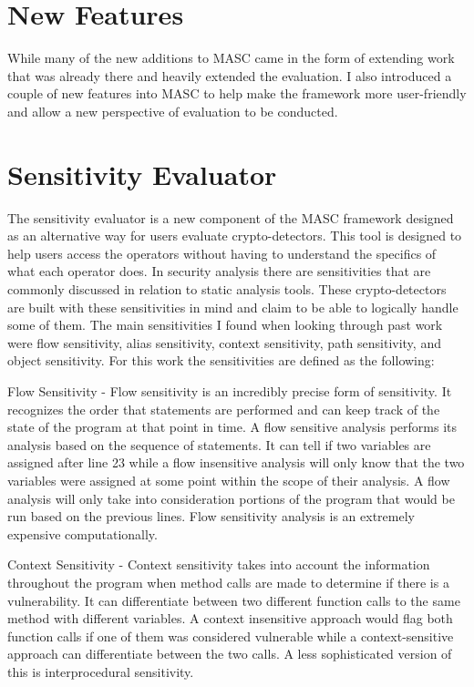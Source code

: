 \section{New Features}
\label{ch3:sec:new-features}

While many of the new additions to MASC came in the form of extending work that was already there and heavily extended the evaluation. I also introduced a couple of new features into MASC to help make the framework more user-friendly and allow a new perspective of evaluation to be conducted.

\section{Sensitivity Evaluator}
\label{ch3:subsec:sensitities}

The sensitivity evaluator is a new component of the MASC framework designed as an alternative way for users evaluate crypto-detectors. This tool is designed to help users access the operators without having to understand the specifics of what each operator does. In security analysis there are sensitivities that are commonly discussed in relation to static analysis tools. These crypto-detectors are built with these sensitivities in mind and claim to be able to logically handle some of them. The main sensitivities I found when looking through past work were flow sensitivity, alias sensitivity, context sensitivity, path sensitivity, and object sensitivity. For this work the sensitivities are defined as the following:

Flow Sensitivity - Flow sensitivity is an incredibly precise form of sensitivity. It recognizes the order that statements are performed and can keep track of the state of the program at that point in time. A flow sensitive analysis performs its analysis based on the sequence of statements. It can tell if two variables are assigned after line 23 while a flow insensitive analysis will only know that the two variables were assigned at some point within the scope of their analysis. A flow analysis will only take into consideration portions of the program that would be run based on the previous lines. Flow sensitivity analysis is an extremely expensive computationally.

Context Sensitivity - Context sensitivity takes into account the information throughout the program when method calls are made to determine if there is a vulnerability. It can differentiate between two different function calls to the same method with different variables. A context insensitive approach would flag both function calls if one of them was considered vulnerable while a context-sensitive approach can differentiate between the two calls. A less sophisticated version of this is interprocedural sensitivity.

